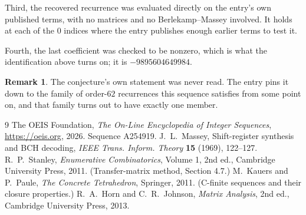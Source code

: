 \documentclass[11pt,a4paper]{article}
\theoremstyle{plain}
\theoremstyle{definition}
\newtheorem{remark}[theorem]{Remark}
\begin{document}
Third, the recovered recurrence was evaluated directly on the entry's own published terms, with
no matrices and no Berlekamp--Massey involved. It holds at each of the $0$ indices where
the entry publishes enough earlier terms to test it.

Fourth, the last coefficient was checked to be nonzero, which is what the identification above
turns on; it is $-9895604649984$.

\begin{remark}
The conjecture's own statement was never read. The entry pins it down to the family of
order-$62$ recurrences this sequence satisfies from some point on, and that family turns
out to have exactly one member.
\end{remark}

\begin{thebibliography}{9}
 The OEIS Foundation, \emph{The On-Line Encyclopedia of Integer
Sequences}, \url{https://oeis.org}, 2026. Sequence A254919.
 J.~L.~Massey, Shift-register synthesis and BCH decoding, \emph{IEEE
Trans. Inform. Theory} \textbf{15} (1969), 122--127.
 R.~P.~Stanley, \emph{Enumerative Combinatorics}, Volume 1, 2nd ed.,
Cambridge University Press, 2011. (Transfer-matrix method, Section 4.7.)
 M.~Kauers and P.~Paule, \emph{The Concrete Tetrahedron}, Springer, 2011.
(C-finite sequences and their closure properties.)
 R.~A.~Horn and C.~R.~Johnson, \emph{Matrix Analysis}, 2nd ed., Cambridge
University Press, 2013.
\end{thebibliography}
\end{document}
